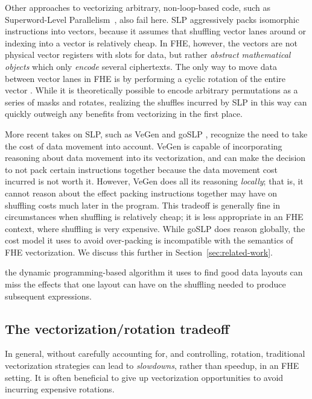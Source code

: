 Other approaches to vectorizing arbitrary, non-loop-based code, such as Superword-Level Parallelism~\cite{SLP}, also fail here.
SLP aggressively packs isomorphic instructions into vectors, because it assumes that shuffling vector lanes around or indexing into a vector is relatively cheap.
In FHE, however, the vectors are not physical vector registers with slots for data, but rather {\em abstract mathematical objects} which only {\em encode} several ciphertexts.
The only way to move data between vector lanes in FHE is by performing a cyclic rotation of the entire vector .
While it is theoretically possible to encode arbitrary permutations as a series of masks and rotates, realizing the shuffles incurred by SLP in this way can quickly outweigh any benefits from vectorizing in the first place. 

More recent takes on SLP, such as VeGen \cite{VeGen} and goSLP \cite{goSLP}, recognize the need to take the cost of data movement into account.
VeGen is capable of incorporating reasoning about data movement into its vectorization, and can make the decision to not pack certain instructions together because the data movement cost incurred is not worth it.
However, VeGen does all its reasoning {\em locally}; that is, it cannot reason about the effect packing instructions together may have on shuffling costs much later in the program. This tradeoff is generally fine in circumstances when shuffling is relatively cheap; it is less appropriate in an FHE context, where shuffling is very expensive.
While goSLP does reason globally, the cost model it uses to avoid over-packing is incompatible with the semantics of FHE vectorization.
We discuss this further in Section~\ref{sec:related-work}.

the dynamic programming-based algorithm it uses to find good data layouts can miss the effects that one layout can have on the shuffling needed to produce subsequent expressions. %

\subsection*{The vectorization/rotation tradeoff}

In general, without carefully accounting for, and controlling, rotation, traditional vectorization strategies can lead to {\em slowdowns}, rather than speedup, in an FHE setting. It is often beneficial to give up vectorization opportunities to avoid incurring expensive rotations.

